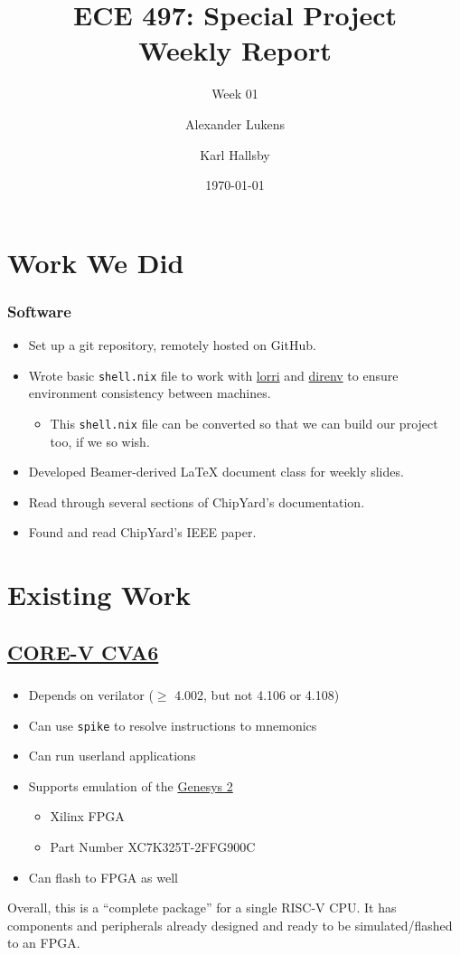 \documentclass{weeklyslides}
\title[Weekly Report]{ECE 497: Special Project \\ Weekly Report}
\subtitle{Week 01}
\author{Alexander Lukens \and Karl Hallsby}
\institute{Illinois Institute of Technology}
\date{\today}
\begin{document}
\begin{frame}
  \titlepage{}
\end{frame}

\section{Work We Did}\label{sec:Work_We_Did}
\begin{frame}
  \frametitle{Software}
  \begin{itemize}
  \item Set up a git repository, remotely hosted on GitHub.
  \item Wrote basic \texttt{shell.nix} file to work with \href{https://github.com/target/lorri}{lorri} and \href{https://github.com/direnv/direnv}{direnv} to ensure environment consistency between machines.
    \begin{itemize}
    \item This \texttt{shell.nix} file can be converted so that
      we can build our project too, if we so wish.
    \end{itemize}
  \item Developed Beamer-derived \LaTeX{} document class for weekly slides.
  \item Read through several sections of ChipYard's documentation.
  \item Found and read ChipYard's IEEE paper.
  \end{itemize}
\end{frame}

\section{Existing Work}\label{sec:Existing_Work}
\subsection{\href{https://github.com/openhwgroup/cva6}{CORE-V CVA6}}\label{sec:CORE_V_CVA6}
\begin{frame}
  \frametitle{}
  \begin{itemize}
  \item Depends on verilator ($\geq$ 4.002, but not 4.106 or 4.108)
  \item Can use \texttt{spike} to resolve instructions to mnemonics
  \item Can run userland applications
  \item Supports emulation of the \href{https://reference.digilentinc.com/reference/programmable-logic/genesys-2/reference-manual}{Genesys 2}
    \begin{itemize}
    \item Xilinx FPGA
    \item Part Number XC7K325T-2FFG900C
    \end{itemize}
  \item Can flash to FPGA as well
  \end{itemize}

  Overall, this is a ``complete package'' for a single RISC-V CPU.\@
  It has components and peripherals already designed and ready to be simulated/flashed to an FPGA.\@
\end{frame}
\end{document}
